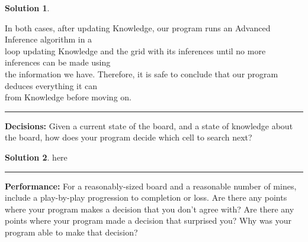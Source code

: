 \documentclass{article}
\theoremstyle{definition}
\def\fline{\rule{0.75\linewidth}{0.5pt}}
\newcommand{\finishline}{\vspace{-15pt}\begin{center}\fline\end{center}}
\newtheorem*{solution*}{Solution}
\newenvironment{solution}{\begin{solution*}}{{\finishline} \end{solution*}}
\begin{document}
\begin{solution}
\begin{tabbing}
    \>In both cases, after updating Knowledge, our program runs an Advanced Inference algorithm in a\\ \>loop updating Knowledge and the grid with its inferences until no more inferences can be made using\\ \> the information we have. Therefore, it is safe to conclude that our program deduces everything it can\\ \> from Knowledge before moving on.\\
	\end{tabbing}
\end{solution}

\smallskip

\textbf{Decisions:}
	Given a current state of the board, and a state of knowledge about the board, how does your program decide which cell to search next? 
\begin{solution}
	here
\end{solution}

\smallskip

\textbf{Performance: }
	For a reasonably-sized board and a reasonable number of mines, include a play-by-play progression to completion or loss. Are there any points where your program makes a decision that you don’t agree with?
Are there any points where your program made a decision that surprised you? 
Why was your program able to make that decision? 


\smallskip
\end{document}
